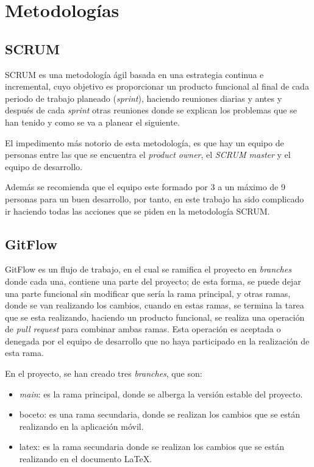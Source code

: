 
\section{Metodologías}
\subsection{SCRUM}

    SCRUM es una metodología ágil basada en una estrategia continua e incremental, cuyo objetivo es proporcionar un producto funcional al final de cada periodo de trabajo planeado (\textit{sprint}), haciendo reuniones diarias y antes y después de cada \textit{sprint} otras reuniones donde se explican los problemas que se han tenido y como se va a planear el siguiente.

    El impedimento más notorio de esta metodología, es que hay un equipo de personas entre las que se encuentra el \textit{product owner}, el \textit{SCRUM master} y el equipo de desarrollo. 
    
    Además se recomienda que el equipo este formado por 3 a un máximo de 9 personas para un buen desarrollo, por tanto, en este trabajo ha sido complicado ir haciendo todas las acciones que se piden en la metodología SCRUM.

\subsection{GitFlow}

    GitFlow es un flujo de trabajo, en el cual se ramifica el proyecto en \textit{branches} donde cada una, contiene una parte del proyecto; de esta forma, se puede dejar una parte funcional sin modificar que sería la rama principal, y otras ramas, donde se van realizando los cambios, cuando en estas ramas, se termina la tarea que se esta realizando, haciendo un producto funcional, se realiza una operación de \textit{pull request} para combinar ambas ramas. Esta operación es aceptada o denegada por el equipo de desarrollo que no haya participado en la realización de esta rama.

    En el proyecto, se han creado tres \textit{branches}, que son:
    \begin{itemize}
        \item \textit{main}: es la rama principal, donde se alberga la versión estable del proyecto.
        \item boceto: es una rama secundaria, donde se realizan los cambios que se están realizando en la aplicación móvil.
        \item latex: es la rama secundaria donde se realizan los cambios que se están realizando en el documento LaTeX.
    \end{itemize}
